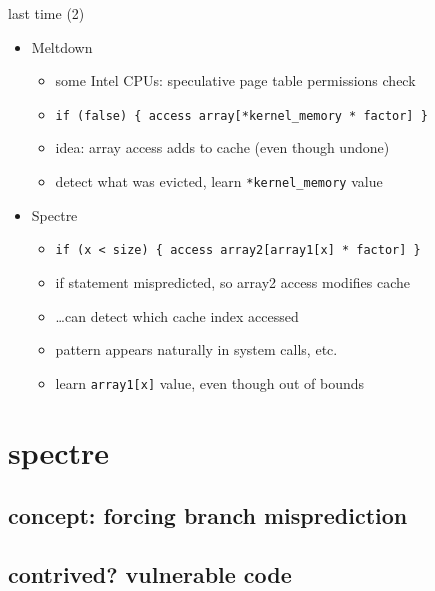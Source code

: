 \begin{frame}[fragile]{last time (2)}
    \begin{itemize}
    \item Meltdown 
        \begin{itemize}
        \item some Intel CPUs: speculative page table permissions check
        \item \verb|if (false) { access array[*kernel_memory * factor] }|
        \item idea: array access adds to cache (even though undone)
        \item detect what was evicted, learn \verb|*kernel_memory| value
        \end{itemize}
    \item Spectre
        \begin{itemize}
        \item \verb|if (x < size) { access array2[array1[x] * factor] }|
        \item if statement mispredicted, so array2 access modifies cache
        \item \ldots can detect which cache index accessed
        \item pattern appears naturally in system calls, etc.
        \item learn \verb|array1[x]| value, even though out of bounds
        \end{itemize}
    \end{itemize}
\end{frame}












\section{spectre}
\subsection{concept: forcing branch misprediction}


\subsection{contrived? vulnerable code}


